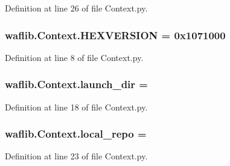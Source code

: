 Definition at line 26 of file Context.\+py.

\subsubsection[{\texorpdfstring{H\+E\+X\+V\+E\+R\+S\+I\+ON}{HEXVERSION}}]{ waflib.\+Context.\+H\+E\+X\+V\+E\+R\+S\+I\+ON = 0x1071000}\hypertarget{namespacewaflib_1_1_context_a26b498d8a1b686a1226796827d620ed8}{}\label{namespacewaflib_1_1_context_a26b498d8a1b686a1226796827d620ed8}


Definition at line 8 of file Context.\+py.

\subsubsection[{\texorpdfstring{launch\+\_\+dir}{launch_dir}}]{ waflib.\+Context.\+launch\+\_\+dir = \textquotesingle{}\textquotesingle{}}\hypertarget{namespacewaflib_1_1_context_a684b0d17ca2e737ac09513ea6aac56e1}{}\label{namespacewaflib_1_1_context_a684b0d17ca2e737ac09513ea6aac56e1}


Definition at line 18 of file Context.\+py.

\subsubsection[{\texorpdfstring{local\+\_\+repo}{local_repo}}]{ waflib.\+Context.\+local\+\_\+repo = \textquotesingle{}\textquotesingle{}}\hypertarget{namespacewaflib_1_1_context_a64aa02f396d01c056ddf1c0562e72aaa}{}\label{namespacewaflib_1_1_context_a64aa02f396d01c056ddf1c0562e72aaa}


Definition at line 23 of file Context.\+py.

